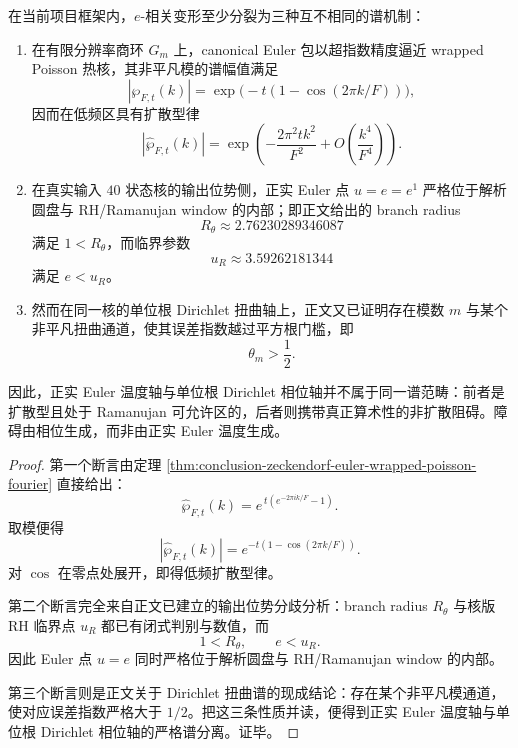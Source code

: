 \begin{theorem}\label{thm:conclusion-zeckendorf-euler-temperature-phase-spectral-separation}
在当前项目框架内，\(e\)-相关变形至少分裂为三种互不相同的谱机制：
\begin{enumerate}
  \item 在有限分辨率商环 \(G_m\) 上，canonical Euler 包以超指数精度逼近 wrapped Poisson 热核，其非平凡模的谱幅值满足
  \[
  |\widehat\wp_{F,t}(k)|
  =
  \exp\!\bigl(-t(1-\cos(2\pi k/F))\bigr),
  \]
  因而在低频区具有扩散型律
  \[
  |\widehat\wp_{F,t}(k)|
  =
  \exp\!\left(
  -\frac{2\pi^2tk^2}{F^2}
  +O\!\left(\frac{k^4}{F^4}\right)
  \right).
  \]
  \item 在真实输入 \(40\) 状态核的输出位势侧，正实 Euler 点 \(u=e=e^1\) 严格位于解析圆盘与 RH/Ramanujan window 的内部；即正文给出的 branch radius
  \[
  R_\theta\approx 2.76230289346087
  \]
  满足 \(1<R_\theta\)，而临界参数
  \[
  u_R\approx 3.59262181344
  \]
  满足 \(e<u_R\)。
  \item 然而在同一核的单位根 Dirichlet 扭曲轴上，正文又已证明存在模数 \(m\) 与某个非平凡扭曲通道，使其误差指数越过平方根门槛，即
  \[
  \theta_m>\frac12.
  \]
\end{enumerate}
因此，正实 Euler 温度轴与单位根 Dirichlet 相位轴并不属于同一谱范畴：前者是扩散型且处于 Ramanujan 可允许区的，后者则携带真正算术性的非扩散阻碍。障碍由相位生成，而非由正实 Euler 温度生成。
\end{theorem}
\begin{proof}
第一个断言由定理 \ref{thm:conclusion-zeckendorf-euler-wrapped-poisson-fourier} 直接给出：
\[
\widehat\wp_{F,t}(k)=e^{\,t(e^{-2\pi i k/F}-1)}.
\]
取模便得
\[
|\widehat\wp_{F,t}(k)|=e^{-t(1-\cos(2\pi k/F))}.
\]
对 \(\cos\) 在零点处展开，即得低频扩散型律。

第二个断言完全来自正文已建立的输出位势分歧分析：branch radius \(R_\theta\) 与核版 RH 临界点 \(u_R\) 都已有闭式判别与数值，而
\[
1<R_\theta,
\qquad
e<u_R.
\]
因此 Euler 点 \(u=e\) 同时严格位于解析圆盘与 RH/Ramanujan window 的内部。

第三个断言则是正文关于 Dirichlet 扭曲谱的现成结论：存在某个非平凡模通道，使对应误差指数严格大于 \(1/2\)。把这三条性质并读，便得到正实 Euler 温度轴与单位根 Dirichlet 相位轴的严格谱分离。证毕。
\end{proof}

